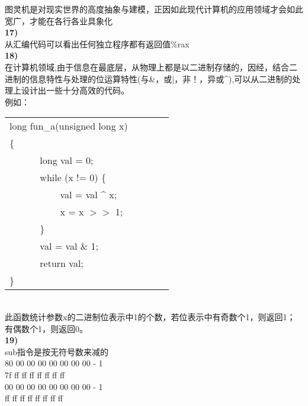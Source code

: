 \documentclass{article}
\begin{document}
\begin{CJK}{UTF8}{uyhei}
图灵机是对现实世界的高度抽象与建模，正因如此现代计算机的应用领域才会如此宽广，才能在各行各业具象化	\\
\textbf{17)}	\\
从汇编代码可以看出任何独立程序都有返回值\%rax	\\
\textbf{18)}	\\
在计算机领域,由于信息在最底层，从物理上都是以二进制存储的，因经，结合二进制的信息特性与处理的位运算特性(与\&，或$|$，非！，异或\^{}),可以从二进制的处理上设计出一些十分高效的代码。	\\
例如：	\\[-2ex]
\begin{table}[ht]
\begin{tabular}{m{2em}m{2em}m{2em}l}
	\multicolumn{3}{l}{long fun\_a(unsigned long x)}	\\
\{	\\
	&	\multicolumn{3}{l}{long val = 0;}	\\
	&	\multicolumn{3}{l}{ while (x != 0) \{ } 	\\
	&	&	\multicolumn{2}{l}{val = val \^{} x;}	\\
	&	&	\multicolumn{2}{l}{x = x $>>$ 1;}	\\
	&	\multicolumn{3}{l}{ \} } 	\\
	&	\multicolumn{3}{l}{val = val \& 1;} 	\\
	&	\multicolumn{3}{l}{return val;} 	\\
\}	\\
\end{tabular}
\end{table}	\\
此函数统计参数x的二进制位表示中1的个数，若位表示中有奇数个1，则返回1；有偶数个1，则返回0。	\\[1ex]
\textbf{19)}	\\
sub指令是按无符号数来减的	\\
80 00 00 00 00 00 00 00 - 1	\\
7f ff ff ff ff ff ff ff		\\[2ex]
00 00 00 00 00 00 00 00 - 1	\\
ff ff ff ff ff ff ff ff


\end{CJK}
\end{document}
